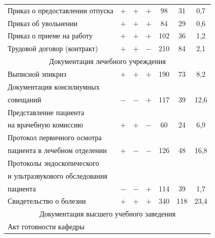 \begin{table}
\begin{center}
\begin{tabular}{|l|c|c|c|c|c|c|}
Приказ о предоставлении отпуска&$+$&$+$&$+$&\hphantom{9}98&31&\hphantom{9}0,7\\


Приказ об увольнении&$+$&$+$&$+$&\hphantom{9}84&29&\hphantom{9}0,6\\


Приказ о приеме на работу&$+$&$+$&$+$&102&36&\hphantom{9}1,2\\


Трудовой договор (контракт)&$+$&$+$&$-$&210&84&\hphantom{9}2,1\\


\hline


\multicolumn{7}{|c|}{Документация лечебного учреждения}\\


\hline


Выписной эпикриз&$+$&$+$&$+$&190&73&\hphantom{9}8,2\\


Документация консилиумных&&&&&&\\


совещаний&$-$&$-$&$+$&117&39&12,6\\


Представление пациента&&&&&&\\


на врачебную комиссию&$+$&$+$&$-$&\hphantom{9}60&24&\hphantom{9}6,9\\


Протокол первичного осмотра&&&&&&\\


пациента в лечебном отделении&$+$&$-$&$-$&126&48&16,8\\


Протоколы эндоскопического &&&&&&\\


и ультразвукового обследования&&&&&&\\


пациента&$-$&$-$&$+$&114&39&\hphantom{9}1,7\\


Свидетельство о болезни&$+$&$+$&$+$&340&118\hphantom{9}&23,4\\


\hline


\multicolumn{7}{|c|}{Документация высшего учебного заведения}\\


\hline


Акт готовности кафедры&&&&&&\\



\end{tabular}
\end{center}
\end{table}
